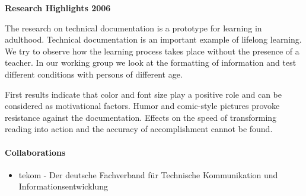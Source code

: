 \null
\textbf{Research Highlights 2006}

 The research on technical documentation is a prototype for learning in adulthood. Technical documentation is an important example of lifelong learning. We try to observe how the learning process takes place without the presence of a teacher. In our working group we look at the formatting of information and test different conditions with persons of different age. 

 First results indicate that color and font size play a positive role and can be considered as motivational factors. Humor and comic-style pictures provoke resistance against the documentation. Effects on the speed of transforming reading into action and the accuracy of accomplishment cannot be found.


\paragraph{Collaborations}
\begin{itemize}
\item tekom - Der deutsche Fachverband f\"{u}r Technische Kommunikation und Informationsentwicklung
\end{itemize}

\begin{bibunit}[apalike]
\nocite{*}
\putbib[profClemensSchwender2]
\end{bibunit}